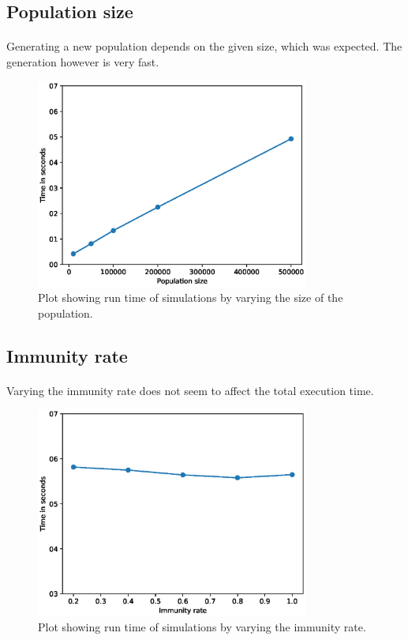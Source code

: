 \documentclass[runningheads]{llncs}
\begin{document}
\subsection{Population size}

\paragraph{} Generating a new population depends on the given size, which was expected. The generation however is very fast.
\begin{figure}[h!]
\centering
	\includegraphics[width=0.8\textwidth]{3_GProf_popsize.eps}
	\caption{Plot showing run time of simulations by varying the size of the population.} 
	\label{Gprof_popsize}
\end{figure}

\subsection{Immunity rate}

\paragraph{} Varying the immunity rate does not seem to affect the total execution time.
\begin{figure}[h!]
\centering
	\includegraphics[width=0.8\textwidth]{3_GProf_immunityrate.eps}
	\caption{Plot showing run time of simulations by varying the immunity rate.} 
	\label{Gprof_immunityrate}
\end{figure}
\end{document}
